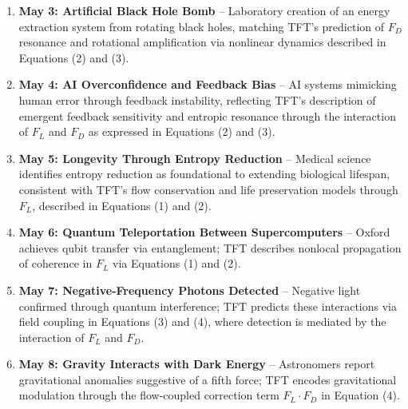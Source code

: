 \documentclass[11pt]{article}
\begin{document}
\begin{enumerate}
\item \textbf{May 3: Artificial Black Hole Bomb} – Laboratory creation of an energy extraction system from rotating black holes, matching TFT's prediction of \(F_D\) resonance and rotational amplification via nonlinear dynamics described in Equations (2) and (3).

\item \textbf{May 4: AI Overconfidence and Feedback Bias} – AI systems mimicking human error through feedback instability, reflecting TFT's description of emergent feedback sensitivity and entropic resonance through the interaction of \(F_L\) and \(F_D\) as expressed in Equations (2) and (3).

\item \textbf{May 5: Longevity Through Entropy Reduction} – Medical science identifies entropy reduction as foundational to extending biological lifespan, consistent with TFT's flow conservation and life preservation models through \(F_L\), described in Equations (1) and (2).

\item \textbf{May 6: Quantum Teleportation Between Supercomputers} – Oxford achieves qubit transfer via entanglement; TFT describes nonlocal propagation of coherence in \(F_L\) via Equations (1) and (2).

\item \textbf{May 7: Negative-Frequency Photons Detected} – Negative light confirmed through quantum interference; TFT predicts these interactions via field coupling in Equations (3) and (4), where detection is mediated by the interaction of \(F_L\) and \(F_D\).

\item \textbf{May 8: Gravity Interacts with Dark Energy} – Astronomers report gravitational anomalies suggestive of a fifth force; TFT encodes gravitational modulation through the flow-coupled correction term \(F_L \cdot F_D\) in Equation (4).

\end{enumerate}
\end{document}
